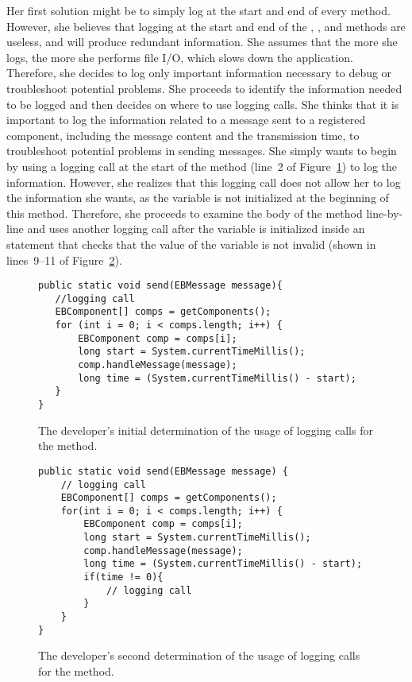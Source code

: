 Her first solution might be to simply log at the start and end of every method. However, she believes that logging at the start and end of the , \-\-, and  methods are useless, and will produce redundant information. She assumes that the more she logs, the more she performs file I/O, which slows down the application. Therefore, she decides to log only important information necessary to debug or troubleshoot potential problems. She proceeds to identify the information needed to be logged and then decides on where to use logging calls. She thinks that it is important to log the information related to a message sent to a registered component, including the message content and the transmission time, to troubleshoot potential problems in sending messages. She simply wants to begin by using a logging call at the start of the  method (line~2 of Figure~\ref{ch2-ex-logged-m1}) to log the information. However, she realizes that this logging call does not allow her to log the information she wants, as the  variable is not initialized at the beginning of this method. Therefore, she proceeds to examine the body of the  method line-by-line and uses another logging call after the  variable is initialized inside an  statement that checks that the value of the variable  is not invalid (shown in lines~9--11 of Figure~\ref{ch2-ex-logged-m2}).

\begin{figure}[p]
\def\baselinestretch{1}
\begin{lstlisting}
public static void send(EBMessage message){
   //logging call
   EBComponent[] comps = getComponents();
   for (int i = 0; i < comps.length; i++) {
       EBComponent comp = comps[i];
       long start = System.currentTimeMillis();
       comp.handleMessage(message);
       long time = (System.currentTimeMillis() - start);
   }
}
\end{lstlisting}
\caption{The developer's initial determination of the usage of logging calls for the  method.\label{ch2-ex-logged-m1}}
\end{figure}

\begin{figure}[p]
\def\baselinestretch{1}
\begin{lstlisting}
public static void send(EBMessage message) {
    // logging call
    EBComponent[] comps = getComponents();
    for(int i = 0; i < comps.length; i++) {
        EBComponent comp = comps[i];
        long start = System.currentTimeMillis();
        comp.handleMessage(message);
        long time = (System.currentTimeMillis() - start);
        if(time != 0){
            // logging call
        }
    }
}
\end{lstlisting}
\caption{The developer's second determination of the usage of logging calls for the  method.\label{ch2-ex-logged-m2}}
\end{figure}


